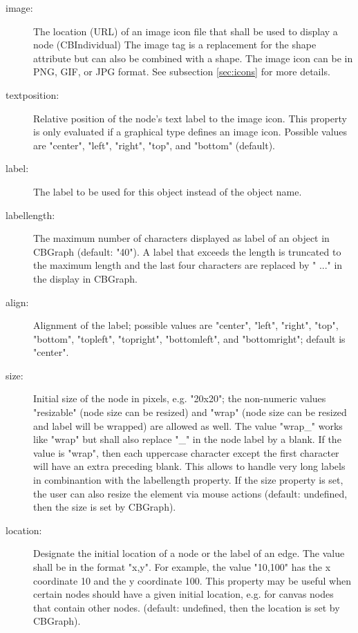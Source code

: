 \begin{description}
\item[image:]
    The location (URL) of an image icon file that shall be used to display a node (CBIndividual)
    The image tag is a replacement for the shape attribute but can also be combined with a shape.
    The image icon can be in PNG, GIF, or JPG format.
    See subsection \ref{sec:icons} for more details.

\item[textposition:]
    Relative position of the node's text label to the image icon. This property is only evaluated if
    a graphical type defines an image icon. Possible values are "center", "left", "right", "top",
    and "bottom" (default).

\item[label:]
    The label to be used for this object instead of the object name.

\item[labellength:]
    The maximum number of characters displayed as label of an object in CBGraph (default: "40").
    A label that exceeds the length is truncated to the maximum length and the last four
    characters are replaced by " ..." in the display in CBGraph.

\item[align:]
    Alignment of the label; possible values are "center", "left", "right", "top", "bottom",
    "topleft", "topright", "bottomleft", and "bottomright"; default is "center".

\item[size:]
    Initial size of the node in pixels, e.g. "20x20";
    the non-numeric values "resizable" (node size can be resized) and
    "wrap" (node size can be resized and label will be wrapped) are allowed as well.
    The value "wrap\_" works like "wrap" but shall also replace "\_" in the node label by
    a blank. If the value is "wrap", then each uppercase character except the first character will have an extra preceding blank.
    This allows to handle very long labels in combinantion with the labellength property.
    If the size property is set, the user can also resize the element via mouse actions
    (default: undefined, then the size is set by CBGraph).

\item[location:]
    Designate the initial location of a node or the label of an edge. The value shall be in
    the format "x,y". For example, the value "10,100" has the x coordinate 10 and the y coordinate 100.
    This property may be useful when certain nodes should have a given initial location, e.g. for
    canvas nodes that contain other nodes.
    (default: undefined, then the location is set by CBGraph).


\end{description}
